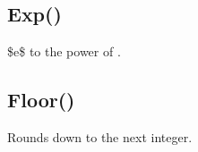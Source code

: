 \documentclass[letterpaper,10pt,english]{sphinxmanual}
\begin{document}
\begin{sphinxVerbatim}[commandchars=\\\{\}]
\end{sphinxVerbatim}

\sphinxAtStartPar
{}

\sphinxAtStartPar
{}


\subsection{Exp()}
\label{\detokenize{reference/peblmath:exp}}
\sphinxAtStartPar
{}

\sphinxAtStartPar
\$e\$ to the power of .

\sphinxAtStartPar
{}

\begin{sphinxVerbatim}[commandchars=\\\{\}]
\end{sphinxVerbatim}

\sphinxAtStartPar
{}

\begin{sphinxVerbatim}[commandchars=\\\{\}]
\end{sphinxVerbatim}

\sphinxAtStartPar
{}

\sphinxAtStartPar
{}


\subsection{Floor()}
\label{\detokenize{reference/peblmath:floor}}
\sphinxAtStartPar
{}

\sphinxAtStartPar
Rounds  down to the next integer.
\end{document}
